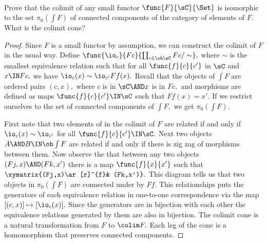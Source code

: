\documentclass[../../main]{subfiles}
\begin{document}
	
	
	\paragraph{}
	\begin{exercise}
		Prove that the colimit of any small functor $ \func{F}{\sC}{\Set} $ is
		isomorphic to the set $ \pi_0(\int F) $ of connected components of the 
		category of elements of $ F. $ What is the colimit cone?
	\end{exercise}
	
	\begin{proof}
		Since $ F $ is a small functor by assumption, we can construct the 
		colimit of
		$ F $ in the usual way. Define $ \func{\io_c}{Fc}{\coprod_{c\in 
			\ob\sC}Fc/\sim},$ where $\sim $ is the smallest equivalence 
			relation 
		such that for all $\func{f}{c}{c'} $ in $ \sC $ and $ x\IN Fc,$ we have 
		$\io_c(x)\sim\io_{c'}Ff(x).$  
		Recall that the objects of $\int F$ are ordered pairs $(c,x),$ where 
		$c$ is in $ \sC \AND 
		x$ is in $ Fc, $ and morphisms are defined as maps
		 $ \func{f}{c}{c'} \IN \sC$ such that $ Ff(x)=x'. $ 
		 If we restrict ourselves to the set of connected components of 
		 $ \int F, $ we get $ \pi_0(\int F). $
		 
		 First note that two elements of in the colimit of $ F $ are 
		 related if and only if $ \io_c(x)\sim \io_{c'}$ for all $ 
		 \func{f}{c}{c'} \IN\sC.$ Next two objects $A\AND B\IN \ob\int F $ are 
		 related if and only if there is zig zag of morphisms between them.
		 Now observe the that between any two objects $ (Fj,x)\AND (Fk,x') $
		 there is a map $ \func{f}{x}{x'} $ such that
		 $\xymatrix{(Fj,x)\ar[r]^{f}& (Fk,x')}.$
		This diagram tells us that two objects in $\pi_0(\int F)$
		are connected under by $Ff.$ This relationships puts the 
		generators of each equivalence relation in one-to-one correspondence
		via the map $ [(c,x)]\mapsto [\io_c(x)]. $ Since the generators
		are in bijection with each other the equivalence relations
		generated by them are also in bijection. The colimit cone is a 
		natural transformation from $ F $ to $ \colim F.$ Each leg of the
		cone is a homomorphism that preserves connected components. 
		\end{proof}
	
\end{document}
